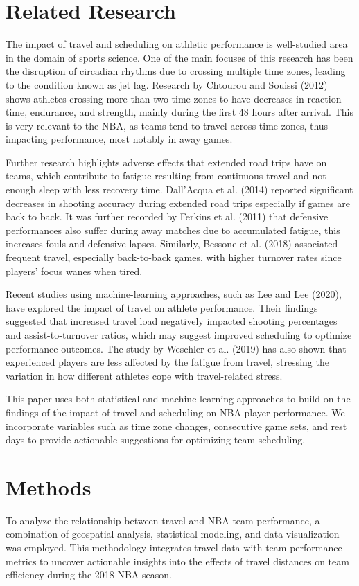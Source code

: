 \documentclass[12pt]{article}
\begin{document}
\section{Related Research}
The impact of travel and scheduling on athletic performance is well-studied area in the domain of sports science. One of the main focuses of this research has been the disruption of circadian rhythms due to crossing multiple time zones, leading to the condition known as jet lag. Research by Chtourou and Souissi (2012) shows athletes crossing more than two time zones to have decreases in reaction time, endurance, and strength, mainly during the first 48 hours after arrival. This is very relevant to the NBA, as teams tend to travel across time zones, thus impacting performance, most notably in away games.

Further research highlights adverse effects that extended road trips have on teams, which contribute to fatigue resulting from continuous travel and not enough sleep with less recovery time. Dall'Acqua et al. (2014) reported significant decreases in shooting accuracy during extended road trips especially if games are back to back. It was further recorded by Ferkins et al. (2011) that defensive performances also suffer during away matches due to accumulated fatigue, this increases fouls and defensive lapses. Similarly, Bessone et al. (2018) associated frequent travel, especially back-to-back games, with higher turnover rates since players' focus wanes when tired.

Recent studies using machine-learning approaches, such as Lee and Lee (2020), have explored the impact of travel on athlete performance. Their findings suggested that increased travel load negatively impacted shooting percentages and assist-to-turnover ratios, which may suggest improved scheduling to optimize performance outcomes. The study by Weschler et al. (2019) has also shown that experienced players are less affected by the fatigue from travel, stressing the variation in how different athletes cope with travel-related stress.

This paper uses both statistical and machine-learning approaches to build on the findings of the impact of travel and scheduling on NBA player performance. We incorporate variables such as time zone changes, consecutive game sets, and rest days to provide actionable suggestions for optimizing team scheduling.

\section{Methods}
To analyze the relationship between travel and NBA team performance, a combination of geospatial analysis, statistical modeling, and data visualization was employed. This methodology integrates travel data with team performance metrics to uncover actionable insights into the effects of travel distances on team efficiency during the 2018 NBA season.
\end{document}
